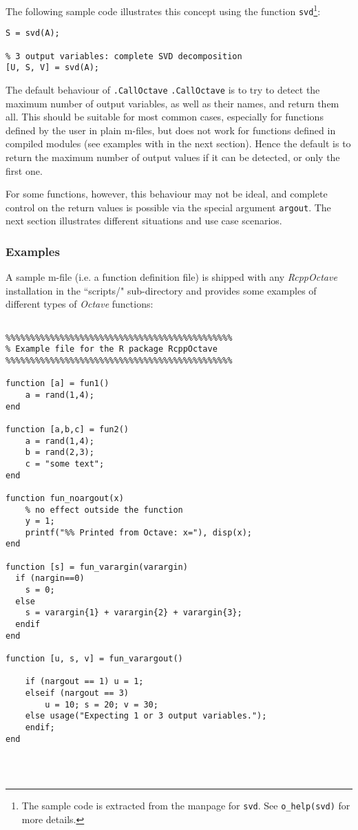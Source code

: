 \documentclass[english,10pt,a4paper]{article}\usepackage{graphicx, color}
\let\proglang=\textit
\let\code=\texttt
\newcommand{\pkgname}[1]{\textit{#1}\xspace}
\newcommand{\octave}{\proglang{Octave}\xspace}
\begin{document}
The following sample code illustrates this concept using the function
\code{svd}\footnote{The sample code is extracted from the manpage for
\code{svd}. See \code{o\_help(svd)} for more details.}:

\begin{Verbatim}[frame=single]
% single output variable: eigen values only
S = svd(A);

% 3 output variables: complete SVD decomposition  
[U, S, V] = svd(A);
\end{Verbatim}

The default behaviour of \code{.CallOctave} \code{.CallOctave} is to try to
detect the maximum number of output variables, as well as their names, and
return them all.
This should be suitable for most common cases, especially for functions
defined by the user in plain m-files, but does not work for functions defined in
compiled modules (see examples with in the next section).
Hence the default is to return the maximum number of output values if it can be
detected, or only the first one.

For some functions, however, this behaviour may not be ideal, and complete
control on the return values is possible via the special argument \code{argout}.
The next section illustrates different situations and use case scenarios.

\subsubsection{Examples}

A sample m-file (i.e. a function definition file) is shipped with any 
\pkgname{RcppOctave} installation in the ``scripts/" sub-directory and provides
some examples of different types of \octave functions:

\begin{Verbatim}[frame=single]

%%%%%%%%%%%%%%%%%%%%%%%%%%%%%%%%%%%%%%%%%%%%%%
% Example file for the R package RcppOctave
%%%%%%%%%%%%%%%%%%%%%%%%%%%%%%%%%%%%%%%%%%%%%%

function [a] = fun1()
	a = rand(1,4);
end

function [a,b,c] = fun2()
	a = rand(1,4);
	b = rand(2,3);
	c = "some text";
end

function fun_noargout(x) 
	% no effect outside the function
	y = 1;
	printf("%% Printed from Octave: x="), disp(x);
end

function [s] = fun_varargin(varargin)
  if (nargin==0)
	s = 0;
  else
	s = varargin{1} + varargin{2} + varargin{3};
  endif
end

function [u, s, v] = fun_varargout()

	if (nargout == 1) u = 1; 
	elseif (nargout == 3)
		u = 10; s = 20; v = 30; 
	else usage("Expecting 1 or 3 output variables.");
	endif; 
end




\end{Verbatim}
\end{document}
